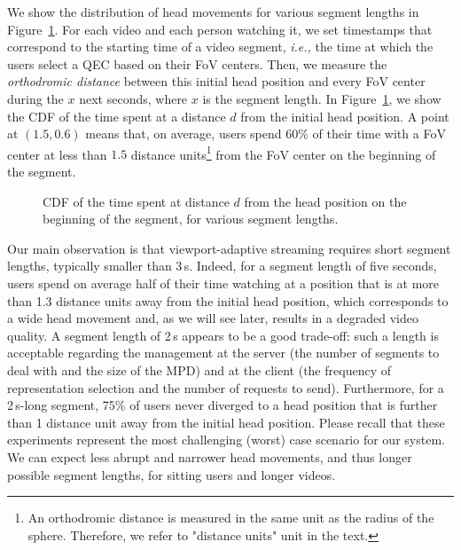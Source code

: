 We show the distribution of head movements for various segment lengths
in Figure~\ref{cdf-dataset}. For each video and each person watching
it, we set timestamps that correspond to the starting time of a video
segment, \textit{i.e.,} the time at which the users select a QEC based
on their FoV centers. Then, we measure the \emph{orthodromic distance}
between this initial head position and every FoV center during the $x$
next seconds, where $x$ is the segment length. In
Figure~\ref{cdf-dataset}, we show the \ac{CDF} of the time spent at a
distance $d$ from the initial head position. A point at $(1.5,0.6)$
means that, on average, users spend $60\%$ of their time with a FoV
center at less than $1.5$ distance units\footnote{An orthodromic distance is measured in the same unit as the radius of the sphere. Therefore, we refer to "distance units" unit in the text.} from the FoV center on the
beginning of the segment.

\begin{figure}[htbp]
\centering

\caption{CDF of the time spent at distance $d$ from the head position on the beginning of the
segment, for various segment lengths.}\label{cdf-dataset}
\end{figure}

Our main observation is that viewport-adaptive streaming requires
short segment lengths, typically smaller than 3\,s. Indeed, for a
segment length of five seconds, users spend on average half of their
time watching at a position that is at more than 1.3 distance units
away from the initial head position, which corresponds to a wide head
movement and, as we will see later, results in a degraded video
quality. A segment length of 2\,s appears to be a good trade-off: such
a length is acceptable regarding the management at the server (the
number of segments to deal with and the size of the \ac{MPD}) and at
the client (the frequency of representation selection and the number
of requests to send). Furthermore, for a 2\,s-long segment, 75\% of
users never diverged to a head position that is further than 1
distance unit away from the initial head position. Please recall that
these experiments represent the most challenging (worst) case scenario
for our system. We can expect less abrupt and narrower head movements,
and thus longer possible segment lengths, for sitting users and longer
videos.

